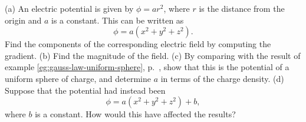 (a) An electric potential is given by $\phi=ar^2$, where $r$ is the distance
from the origin and $a$ is a constant. This can be written as
\begin{equation*}
  \phi = a(x^2+y^2+z^2).
\end{equation*}
Find the components of the corresponding electric field by computing the
gradient.\hwendpart
(b) Find the magnitude of the field.\answercheck\hwendpart
(c) By comparing with the result of example \ref{eg:gauss-law-uniform-sphere},
p.~\pageref{eg:gauss-law-uniform-sphere}, show that this is the potential of
a uniform sphere of charge, and determine $a$ in terms of the charge density.\answercheck\hwendpart
(d) Suppose that the potential had instead been
\begin{equation*}
  \phi = a(x^2+y^2+z^2)+b,
\end{equation*}
where $b$ is a constant. How would this have affected the results?
